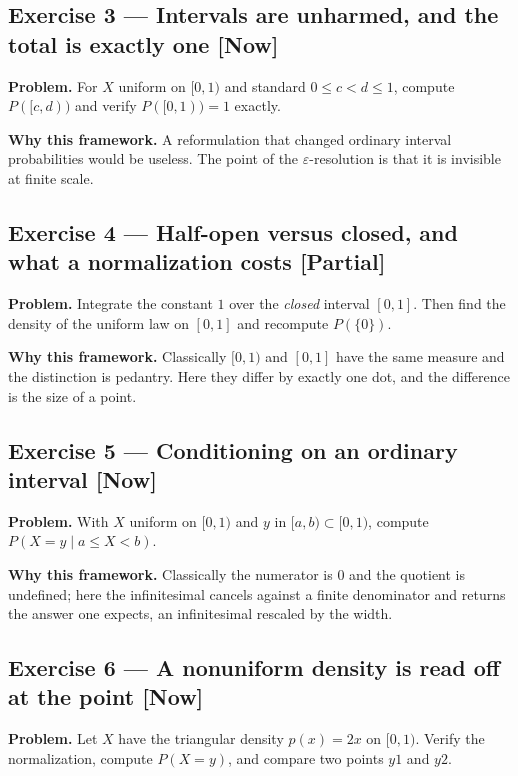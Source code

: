 \documentclass[11pt]{article}
\newcommand{\eps}{\varepsilon}
\begin{document}
\subsection*{Exercise 3 --- Intervals are unharmed, and the total is exactly one \hfill \normalfont\small[Now]}

\textbf{Problem.} For $X$ uniform on $[0,1)$ and standard $0 \le  c < d \le  1$,
compute $P([c,d))$ and verify $P([0,1)) = 1$ exactly.

\textbf{Why this framework.} A reformulation that changed ordinary interval
probabilities would be useless. The point of the $\eps$-resolution is that
it is invisible at finite scale.


\subsection*{Exercise 4 --- Half-open versus closed, and what a normalization costs \hfill \normalfont\small[Partial]}

\textbf{Problem.} Integrate the constant $1$ over the \emph{closed} interval $[0,1]$. Then
find the density of the uniform law on $[0,1]$ and recompute $P(\{0\})$.

\textbf{Why this framework.} Classically $[0,1)$ and $[0,1]$ have the same measure
and the distinction is pedantry. Here they differ by exactly one dot, and the
difference is the size of a point.


\subsection*{Exercise 5 --- Conditioning on an ordinary interval \hfill \normalfont\small[Now]}

\textbf{Problem.} With $X$ uniform on $[0,1)$ and $y$ in $[a,b)\subset [0,1)$,
compute $P(X = y\mid a \le  X < b)$.

\textbf{Why this framework.} Classically the numerator is $0$ and the quotient is
undefined; here the infinitesimal cancels against a finite denominator and
returns the answer one expects, an infinitesimal rescaled by the width.


\subsection*{Exercise 6 --- A nonuniform density is read off at the point \hfill \normalfont\small[Now]}

\textbf{Problem.} Let $X$ have the triangular density $p(x) = 2x$ on $[0,1)$.
Verify the normalization, compute $P(X = y)$, and compare two points $y1$ and
$y2$.
\end{document}
